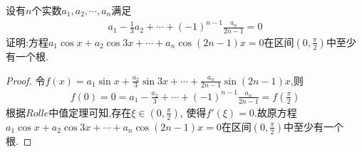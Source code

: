 \documentclass[lang=cn,newtx,10pt,scheme=chinese]{elegantbook}
\begin{document}
\begin{exercise}
    设有\(n\)个实数\(a_1,a_2,\cdots,a_n\)满足
    \begin{gather}
        a_{1}-\frac{1}{3}a_{2}+\cdots+(-1)^{n - 1}\frac{a_{n}}{2n - 1}=0
    \nonumber
    \end{gather}
    证明:方程\(a_1\cos x + a_2\cos3x+\cdots+a_n\cos(2n - 1)x = 0\)在区间\((0,\frac{\pi}{2})\)中至少有一个根.
\end{exercise}
    \begin{proof}
        令$f\left( x \right) =a_1\sin x+\frac{a_2}{3}\sin 3x+\cdots +\frac{a_n}{2n-1}\sin \left( 2n-1 \right) x$,则
        \begin{gather}
            f\left( 0 \right) =0=a_1-\frac{a_2}{3}+\cdots +\left( -1 \right) ^{n-1}\frac{a_n}{2n-1}=f\left( \frac{\pi}{2} \right) 
            \nonumber
        \end{gather}
        根据$Rolle$中值定理可知,存在$\xi\in(0,\frac{\pi}{2})$,
        使得$f'(\xi)=0$.故原方程\(a_1\cos x + a_2\cos3x+\cdots+a_n\cos(2n - 1)x = 0\)在区间\((0,\frac{\pi}{2})\)中至少有一个根.
    \end{proof}
\end{document}
